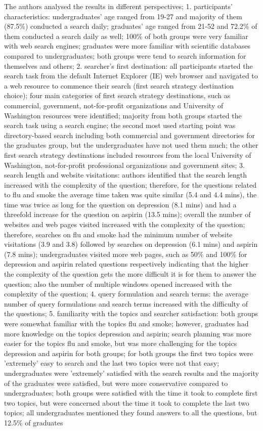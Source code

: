 \documentclass[]{article}
\begin{document}
The authors analysed the results in different perspectives; 1. participants' characteristics: undergraduates' age ranged from 19-27 and majority of them (87.5\%) conducted a search daily; graduates' age ranged from 21-52 and 72.2\% of them conducted a search daily as well; 100\% of both groups were very familiar with web search engines; graduates were more familiar with scientific databases compared to undergraduates; both groups were tend to search information for themselves and others; 2. searcher's first destination: all participants started the search task from the default Internet Explorer (IE) web browser and navigated to a web resource to commence their search (first search strategy destination choice); four main categories of first search strategy destinations, such as commercial, government, not-for-profit organizations and University of Washington resources were identified; majority from both groups started the search task using a search engine; the second most used starting point was directory-based search including both commercial and government directories for the graduates group, but the undergraduates have not used them much; the other first search strategy destinations included resources from the local University of Washington, not-for-profit professional organizations and government sites; 3. search length and website visitations: authors identified that the search length increased with the complexity of the question; therefore, for the questions related to flu and smoke the average time taken was quite similar (5.4 and 4.4 mins), the time was twice as long for the question on depression (8.1 mins) and had a threefold increase for the question on aspirin (13.5 mins); overall the number of websites and web pages visited increased with the complexity of the question; therefore, searches on flu and smoke had the minimum number of website visitations (3.9 and 3.8) followed by searches on depression (6.1 mins) and aspirin (7.8 mins); undergraduates visited more web pages, such as 50\% and 100\% for depression and aspirin related questions respectively indicating that the higher the complexity of the question gets the more difficult it is for them to answer the question; also the number of multiple windows opened increased with the complexity of the question; 4. query formulation and search terms: the average number of query formulations and search terms increased with the difficulty of the questions; 5. familiarity with the topics and searcher satisfaction: both groups were somewhat familiar with the topics flu and smoke; however, graduates had more knowledge on the topics depression and aspirin; search planning was more easier for the topics flu and smoke, but was more challenging for the topics depression and aspirin for both groups; for both groups the first two topics were 'extremely' easy to search and the last two topics were not that easy; undergraduates were 'extremely' satisfied with the search results and the majority of the graduates were satisfied, but were more conservative compared to undergraduates; both groups were satisfied with the time it took to complete first two topics, but were concerned about the time it took to complete the last two topics; all undergraduates mentioned they found answers to all the questions, but 12.5\% of graduates 
\end{document}
